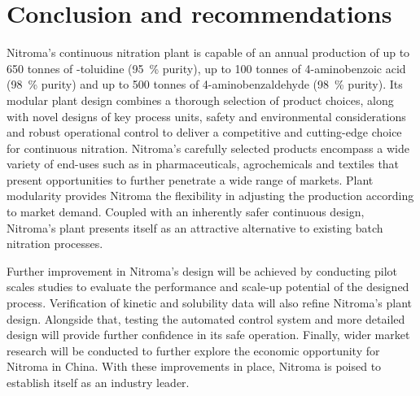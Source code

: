 \section*{Conclusion and recommendations}
Nitroma's continuous nitration plant is capable of an annual production of up to 650 tonnes of \ortho-toluidine (\SI{95}{\percent} purity), up to 100 tonnes of 4-aminobenzoic acid (\SI{98}{\percent} purity) and up to 500 tonnes of 4-aminobenzaldehyde (\SI{98}{\percent} purity). Its modular plant design combines a thorough selection of product choices, along with novel designs of key process units, safety and environmental considerations and robust operational control to deliver a competitive and cutting-edge choice for continuous nitration. Nitroma's carefully selected products encompass a wide variety of end-uses such as in pharmaceuticals, agrochemicals and textiles that present opportunities to further penetrate a wide range of markets. Plant modularity provides Nitroma the flexibility in adjusting the production according to market demand. Coupled with an inherently safer continuous design, Nitroma's plant presents itself as an attractive alternative to existing batch nitration processes.

Further improvement in Nitroma's design will be achieved by conducting pilot scales studies to evaluate the performance and scale-up potential of the designed process. Verification of kinetic and solubility data will also refine Nitroma's plant design. Alongside that, testing the automated control system and more detailed design will provide further confidence in its safe operation. Finally, wider market research will be conducted to further explore the economic opportunity for Nitroma in China. With these improvements in place, Nitroma is poised to establish itself as an industry leader.

